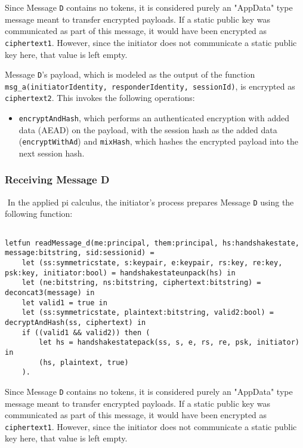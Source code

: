 Since Message \texttt{D} contains no tokens, it is considered purely an "AppData" type message meant to transfer encrypted payloads.
If a static public key was communicated as part of this message, it would have been encrypted as \texttt{ciphertext1}. However, since the initiator does not communicate a static public key here, that value is left empty.


Message \texttt{D}'s payload, which is modeled as the output of the function \texttt{msg\_a(initiatorIdentity, responderIdentity, sessionId)}, is encrypted as \texttt{ciphertext2}. This invokes the following operations:


\begin{itemize}

\item \texttt{encryptAndHash}, which performs an authenticated encryption with added data (AEAD) on the payload, with the session hash as the added data (\texttt{encryptWithAd}) and \texttt{mixHash}, which hashes the encrypted payload into the next session hash.

\end{itemize}
\subsubsection{Receiving Message D}$ $
In the applied pi calculus, the initiator's process prepares Message \texttt{D} using the following function:


\begin{lstlisting}

letfun readMessage_d(me:principal, them:principal, hs:handshakestate, message:bitstring, sid:sessionid) =
	let (ss:symmetricstate, s:keypair, e:keypair, rs:key, re:key, psk:key, initiator:bool) = handshakestateunpack(hs) in
	let (ne:bitstring, ns:bitstring, ciphertext:bitstring) = deconcat3(message) in
	let valid1 = true in
	let (ss:symmetricstate, plaintext:bitstring, valid2:bool) = decryptAndHash(ss, ciphertext) in
	if ((valid1 && valid2)) then (
		let hs = handshakestatepack(ss, s, e, rs, re, psk, initiator) in
		(hs, plaintext, true)
	).

\end{lstlisting}

Since Message \texttt{D} contains no tokens, it is considered purely an "AppData" type message meant to transfer encrypted payloads.
If a static public key was communicated as part of this message, it would have been encrypted as \texttt{ciphertext1}. However, since the initiator does not communicate a static public key here, that value is left empty.


